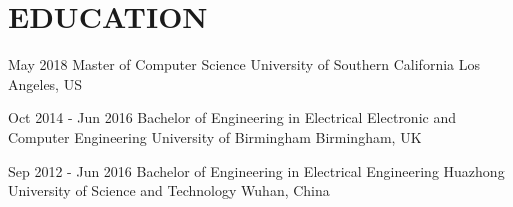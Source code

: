 \section{EDUCATION}

{\edu
{May 2018}
{Master of Computer Science}
{University of Southern California}
{Los Angeles, US}
{}{}{}}

{\edu
{Oct 2014 - Jun 2016}
{Bachelor of Engineering in Electrical Electronic and Computer Engineering}
{University of Birmingham}
{Birmingham, UK}
{}{}{}}

{\edu
{Sep 2012 - Jun 2016}
{Bachelor of Engineering in Electrical Engineering}
{Huazhong University of Science and Technology}
{Wuhan, China}
{}{}{}}

